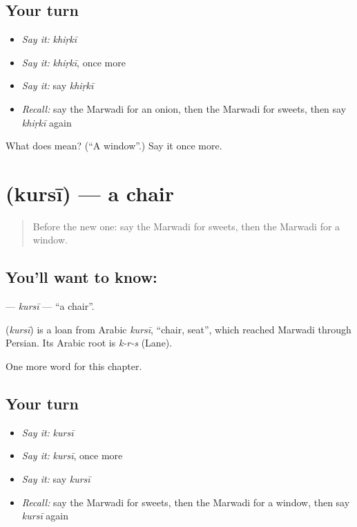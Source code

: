 \subsection*{Your turn}
\begin{itemize}
\raggedright
  \item \emph{Say it:} \emph{khiṛkī}
  \item \emph{Say it:} \emph{khiṛkī}, once more
  \item \emph{Say it:} say \emph{khiṛkī}
  \item \emph{Recall:} say the Marwadi for an onion, then the Marwadi for sweets, then say \emph{khiṛkī} again
\end{itemize}

\begin{tcolorbox}[breakable,colback=teal!4,colframe=teal!35!black,title={Before you move on}]
What does  mean? (\textquotedblleft{}A window\textquotedblright{}.) Say it once more.
\end{tcolorbox}
\section[\texorpdfstring{\mw{कुरसी} (kursī)}{कुरसी (kursī)}]{ (kursī) — a chair}

\label{lesson:MW-C62-kursi}



\begin{quote}
Before the new one: say the Marwadi for sweets, then the Marwadi for a window.
\end{quote}

\subsection*{You'll want to know: }
\textbf{} — \emph{kursī} — \textquotedblleft{}a chair\textquotedblright{}.

\begin{cousinweb}
\textbf{} (\emph{kursī}) is a loan from Arabic \emph{kursī}, \textquotedblleft{}chair, seat\textquotedblright{}, which reached Marwadi through Persian. Its Arabic root is \emph{k-r-s} (Lane).
\end{cousinweb}

\begin{grammarlens}[title={What you've built}]
One more word for this chapter.
\end{grammarlens}

\subsection*{Your turn}
\begin{itemize}
\raggedright
  \item \emph{Say it:} \emph{kursī}
  \item \emph{Say it:} \emph{kursī}, once more
  \item \emph{Say it:} say \emph{kursī}
  \item \emph{Recall:} say the Marwadi for sweets, then the Marwadi for a window, then say \emph{kursī} again
\end{itemize}

